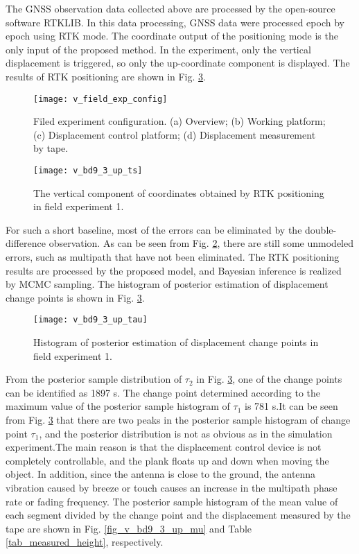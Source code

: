 \documentclass{svjour3}                     %
\begin{document}
The GNSS observation data collected above are processed by the open-source software RTKLIB\citep{takasu2011rtklib}. In this data processing, GNSS data were processed epoch by epoch using RTK mode. The coordinate output of the positioning mode is the only input of the proposed method. In the experiment, only the vertical displacement is triggered, so only the up-coordinate component is displayed. The results of RTK positioning are shown in Fig. \ref{fig_v_bd9_3_up_tau}.
\begin{figure}[htbp]
	\centering
	\texttt{[image: v\_field\_exp\_config]}
	\caption{Filed experiment configuration. (a) Overview; (b) Working platform; (c) Displacement control platform; (d) Displacement measurement by tape. }
	\label{fig_v_field_exp_config}
\end{figure} 
\begin{figure}[htbp]
	\centering
	\texttt{[image: v\_bd9\_3\_up\_ts]}
	\caption{The vertical component of coordinates obtained by RTK positioning in field experiment 1.}
	\label{fig_v_bd9_3_up_ts}
\end{figure} 

For such a short baseline, most of the errors can be eliminated by the double-difference observation. As can be seen from Fig. \ref{fig_v_bd9_3_up_ts}, there are still some unmodeled errors, such as multipath that have not been eliminated. The RTK positioning results are processed by the proposed model, and Bayesian inference is realized by MCMC sampling. The histogram of posterior estimation of displacement change points is shown in Fig. \ref{fig_v_bd9_3_up_tau}.

\begin{figure}[htbp]
	\centering
	\texttt{[image: v\_bd9\_3\_up\_tau]}
	\caption{Histogram of posterior estimation of displacement change points in field experiment 1.}
	\label{fig_v_bd9_3_up_tau}
\end{figure} 
From the posterior sample distribution of $\tau_2$ in Fig. \ref{fig_v_bd9_3_up_tau}, one of the change points can be identified as 1897 s. The change point determined according to the maximum value of the posterior sample histogram of $\tau_1$ is 781 s.It can be seen from Fig. \ref{fig_v_bd9_3_up_tau} that there are two peaks in the posterior sample histogram of change point $\tau_1$, and the posterior distribution is not as obvious as in the simulation experiment.The main reason is that the displacement control device is not completely controllable, and the plank floats up and down when moving the object. In addition, since the antenna is close to the ground, the antenna vibration caused by breeze or touch causes an increase in the multipath phase rate or fading frequency\citep{teunissen2017springer}. The posterior sample histogram of the mean value of each segment divided by the change point and the displacement measured by the tape are shown in Fig. \ref{fig_v_bd9_3_up_mu} and Table \ref{tab_measured_height}, respectively.
\end{document}
